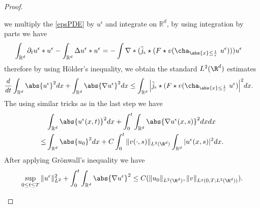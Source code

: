 \begin{proof}
\begin{enumerate}
we multiply the \autoref{epsPDE} by $u^{\epsilon} $  and integrate on $\mathbb{R}^{d} $, by using integration by parts we have
\begin{align*}
\int_{\mathbb{R}^{d} } \partial_t u^{\epsilon} * u^{\epsilon} -  \int_{\mathbb{R}^{d} } \Delta u^{\epsilon}  * u^{\epsilon}  &= - \int \nabla * (\tilde j_{\epsilon}\star (F \star  v (\cha_{\abs{x}\le \frac{1}{\epsilon}} \ u^{\epsilon})) )u^{\epsilon}
\end{align*}
therefore by using H\"older's inequality, we obtain the standard $L^2(\R^d)$ estimates
\begin{align*}
\frac{d}{dt} \int_{\mathbb{R}^{d} } \abs{u^{\epsilon} }^2 dx + \int_{\mathbb{R}^{d} } \abs{\nabla u^{\epsilon} }^2 dx &\le  \int_{\mathbb{R}^{d} } \Big|\tilde j_{\epsilon}\star (F \star  v (\cha_{\abs{x}\le \frac{1}{\epsilon}} \ u^{\epsilon})\Big|^2 dx
.\end{align*}
The using similar tricks as in the last step we have
\begin{align*}
& \int_{\mathbb{R}^{d} } \abs{u^{\epsilon}(x,t) }^2 dx + \int^t_0\int_{\mathbb{R}^{d} } \abs{\nabla u^{\epsilon}(x,s) }^2 dxdx \\
\le & \int_{\mathbb{R}^{d} } \abs{u_0 }^2 dx +C\int^t_0\|v(\cdot,s)\|_{L^2(\R^d)}\int_{\mathbb{R}^{d} } |u^{\epsilon}(x,s)|^2 dx
.\end{align*}
After applying Grönwall's inequality we have
\begin{align*}
\sup_{0 \le t \le T} \|u^{\epsilon} \|^2_{L^{2} } + \int_0^{t} \int_{\mathbb{R}^{d} } \abs{\nabla u^{\epsilon} }^2 \le  C(\|u_0\|_{L^{2} (\R^d)}, \| v \|_{L^q(0,T;L^{2}(\R^d))})
.\end{align*}
\end{enumerate}
\vskip3mm


\end{proof}
